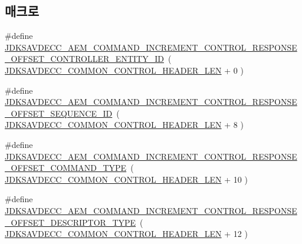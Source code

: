 \subsection*{매크로}
\begin{DoxyCompactItemize}
\item 
\#define \hyperlink{group__command__increment__control__response_gaa8fa863954a6e5bef3cb682f4f715793}{J\+D\+K\+S\+A\+V\+D\+E\+C\+C\+\_\+\+A\+E\+M\+\_\+\+C\+O\+M\+M\+A\+N\+D\+\_\+\+I\+N\+C\+R\+E\+M\+E\+N\+T\+\_\+\+C\+O\+N\+T\+R\+O\+L\+\_\+\+R\+E\+S\+P\+O\+N\+S\+E\+\_\+\+O\+F\+F\+S\+E\+T\+\_\+\+C\+O\+N\+T\+R\+O\+L\+L\+E\+R\+\_\+\+E\+N\+T\+I\+T\+Y\+\_\+\+ID}~( \hyperlink{group__jdksavdecc__avtp__common__control__header_gaae84052886fb1bb42f3bc5f85b741dff}{J\+D\+K\+S\+A\+V\+D\+E\+C\+C\+\_\+\+C\+O\+M\+M\+O\+N\+\_\+\+C\+O\+N\+T\+R\+O\+L\+\_\+\+H\+E\+A\+D\+E\+R\+\_\+\+L\+EN} + 0 )
\item 
\#define \hyperlink{group__command__increment__control__response_gaee90edcc167acbabbd05c7db9c6cdfb0}{J\+D\+K\+S\+A\+V\+D\+E\+C\+C\+\_\+\+A\+E\+M\+\_\+\+C\+O\+M\+M\+A\+N\+D\+\_\+\+I\+N\+C\+R\+E\+M\+E\+N\+T\+\_\+\+C\+O\+N\+T\+R\+O\+L\+\_\+\+R\+E\+S\+P\+O\+N\+S\+E\+\_\+\+O\+F\+F\+S\+E\+T\+\_\+\+S\+E\+Q\+U\+E\+N\+C\+E\+\_\+\+ID}~( \hyperlink{group__jdksavdecc__avtp__common__control__header_gaae84052886fb1bb42f3bc5f85b741dff}{J\+D\+K\+S\+A\+V\+D\+E\+C\+C\+\_\+\+C\+O\+M\+M\+O\+N\+\_\+\+C\+O\+N\+T\+R\+O\+L\+\_\+\+H\+E\+A\+D\+E\+R\+\_\+\+L\+EN} + 8 )
\item 
\#define \hyperlink{group__command__increment__control__response_ga6d328e01dd7f601e5713c2152dc09c76}{J\+D\+K\+S\+A\+V\+D\+E\+C\+C\+\_\+\+A\+E\+M\+\_\+\+C\+O\+M\+M\+A\+N\+D\+\_\+\+I\+N\+C\+R\+E\+M\+E\+N\+T\+\_\+\+C\+O\+N\+T\+R\+O\+L\+\_\+\+R\+E\+S\+P\+O\+N\+S\+E\+\_\+\+O\+F\+F\+S\+E\+T\+\_\+\+C\+O\+M\+M\+A\+N\+D\+\_\+\+T\+Y\+PE}~( \hyperlink{group__jdksavdecc__avtp__common__control__header_gaae84052886fb1bb42f3bc5f85b741dff}{J\+D\+K\+S\+A\+V\+D\+E\+C\+C\+\_\+\+C\+O\+M\+M\+O\+N\+\_\+\+C\+O\+N\+T\+R\+O\+L\+\_\+\+H\+E\+A\+D\+E\+R\+\_\+\+L\+EN} + 10 )
\item 
\#define \hyperlink{group__command__increment__control__response_gafc2d89c1261059486507e42c0f8ac92b}{J\+D\+K\+S\+A\+V\+D\+E\+C\+C\+\_\+\+A\+E\+M\+\_\+\+C\+O\+M\+M\+A\+N\+D\+\_\+\+I\+N\+C\+R\+E\+M\+E\+N\+T\+\_\+\+C\+O\+N\+T\+R\+O\+L\+\_\+\+R\+E\+S\+P\+O\+N\+S\+E\+\_\+\+O\+F\+F\+S\+E\+T\+\_\+\+D\+E\+S\+C\+R\+I\+P\+T\+O\+R\+\_\+\+T\+Y\+PE}~( \hyperlink{group__jdksavdecc__avtp__common__control__header_gaae84052886fb1bb42f3bc5f85b741dff}{J\+D\+K\+S\+A\+V\+D\+E\+C\+C\+\_\+\+C\+O\+M\+M\+O\+N\+\_\+\+C\+O\+N\+T\+R\+O\+L\+\_\+\+H\+E\+A\+D\+E\+R\+\_\+\+L\+EN} + 12 )

\end{DoxyCompactItemize}
